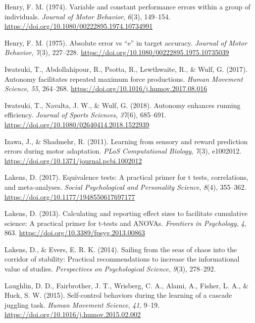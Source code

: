 \documentclass[
  doc, donotrepeattitle,floatsintext]{apa7}
\newlength{\cslhangindent}
\newlength{\cslentryspacingunit} %
\newenvironment{CSLReferences}[2] %
 {%
  \setlength{\parindent}{0pt}
  \ifodd #1
  \let\oldpar\par
  \def\par{\hangindent=\cslhangindent\oldpar}
  \fi
  \setlength{\parskip}{#2\cslentryspacingunit}
 }%
 {}
\begin{document}
\begin{CSLReferences}{1}{0}
\leavevmode{}%
Henry, F. M. (1974). Variable and constant performance errors within a group of individuals. \emph{Journal of Motor Behavior}, \emph{6}(3), 149--154. \url{https://doi.org/10.1080/00222895.1974.10734991}

\leavevmode{}%
Henry, F. M. (1975). Absolute error vs {``e''} in target accuracy. \emph{Journal of Motor Behavior}, \emph{7}(3), 227--228. \url{https://doi.org/10.1080/00222895.1975.10735039}

\leavevmode{}%
Iwatsuki, T., Abdollahipour, R., Psotta, R., Lewthwaite, R., \& Wulf, G. (2017). Autonomy facilitates repeated maximum force productions. \emph{Human Movement Science}, \emph{55}, 264--268. \url{https://doi.org/10.1016/j.humov.2017.08.016}

\leavevmode{}%
Iwatsuki, T., Navalta, J. W., \& Wulf, G. (2018). Autonomy enhances running efficiency. \emph{Journal of Sports Sciences}, \emph{37}(6), 685--691. \url{https://doi.org/10.1080/02640414.2018.1522939}

\leavevmode{}%
Izawa, J., \& Shadmehr, R. (2011). Learning from sensory and reward prediction errors during motor adaptation. \emph{PLoS Computational Biology}, \emph{7}(3), e1002012. \url{https://doi.org/10.1371/journal.pcbi.1002012}

\leavevmode{}%
Lakens, D. (2017). Equivalence tests: {A} practical primer for t tests, correlations, and meta-analyses. \emph{Social Psychological and Personality Science}, \emph{8}(4), 355--362. \url{https://doi.org/10.1177/1948550617697177}

\leavevmode{}%
Lakens, D. (2013). Calculating and reporting effect sizes to facilitate cumulative science: A practical primer for t-tests and {ANOVAs}. \emph{Frontiers in Psychology}, \emph{4}, 863. \url{https://doi.org/10.3389/fpsyg.2013.00863}

\leavevmode{}%
Lakens, D., \& Evers, E. R. K. (2014). Sailing from the seas of chaos into the corridor of stability: Practical recommendations to increase the informational value of studies. \emph{Perspectives on Psychological Science}, \emph{9}(3), 278--292.

\leavevmode{}%
Laughlin, D. D., Fairbrother, J. T., Wrisberg, C. A., Alami, A., Fisher, L. A., \& Huck, S. W. (2015). Self-control behaviors during the learning of a cascade juggling task. \emph{Human Movement Science}, \emph{41}, 9--19. \url{https://doi.org/10.1016/j.humov.2015.02.002}


\end{CSLReferences}
\end{document}
